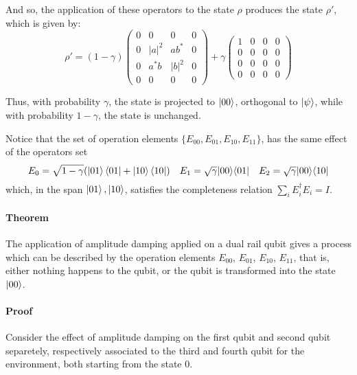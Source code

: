 \documentclass{masterthesis}
\begin{document}
And so, the application of these operators to the state $\rho$ produces the state $\rho'$, which is given by:
\begin{equation}\label{eq:ad-dual-rail}
    \rho' = (1-\gamma)\begin{pmatrix} 0 & 0 & 0 & 0 \\ 0 & |a|^{2} & a b^{*} & 0 \\ 0 & a^{*} b & |b|^{2} & 0 \\ 0 & 0 & 0 & 0 \end{pmatrix} + \gamma\begin{pmatrix} 1 & 0 & 0 & 0 \\ 0 & 0 & 0 & 0 \\ 0 & 0 & 0 & 0 \\ 0 & 0 & 0 & 0 \end{pmatrix}
\end{equation}

Thus, with probability $\gamma$, the state is projected to $\ket{00}$, orthogonal to $\ket{\psi}$, while with probability $1-\gamma$, the state is unchanged. 

Notice that the set of operation elements $\{E_{00}, E_{01}, E_{10}, E_{11}\}$, has the same effect of the operators set
\begin{equation}
    E_{0} = \sqrt{1-\gamma}(\ket{01}\bra{01} + \ket{10}\bra{10}) \quad E_{1} = \sqrt{\gamma}|00\rangle\langle 01| \quad E_{2} = \sqrt{\gamma}|00\rangle\langle 10|
\end{equation}
which, in the span ${\ket{01}, \ket{10}}$, satisfies the completeness relation $\sum_{i} E_{i}^{\dagger} E_{i} = I$.

\paragraph*{Theorem}
The application of amplitude damping applied on a dual rail qubit gives a process which can be described by the operation elements \hyperref[eq:op-el-1]{$E_{00}$}, \hyperref[eq:op-el-2]{$E_{01}$}, \hyperref[eq:op-el-3]{$E_{10}$}, \hyperref[eq:op-el-4]{$E_{11}$}, that is, either nothing happens to the qubit, or the qubit is transformed into the state $\ket{00}$. 

\paragraph*{Proof}
Consider the effect of amplitude damping on the first qubit and second qubit separetely, respectively associated to the third and fourth qubit for the environment, both starting from the state 0.
\end{document}

